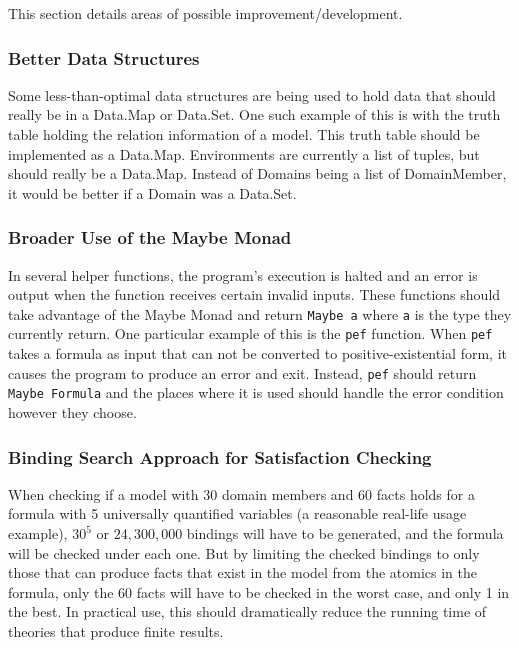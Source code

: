 		This section details areas of possible improvement/development.

		\subsubsection{Better Data Structures}

			Some less-than-optimal data structures are being used to hold data
			that should really be in a Data.Map or Data.Set. One such example
			of this is with the truth table holding the relation information of
			a model. This truth table should be implemented as a Data.Map.
			Environments are currently a list of tuples, but should really be a
			Data.Map. Instead of Domains being a list of DomainMember, it
			would be better if a Domain was a Data.Set.

		\subsubsection{Broader Use of the Maybe Monad}

			In several helper functions, the program's execution is halted and
			an error is output when the function receives certain invalid
			inputs. These functions should take advantage of the Maybe Monad
			and return {\tt Maybe a} where {\tt a} is the type they currently
			return. One particular example of this is the {\tt pef} function.
			When {\tt pef} takes a formula as input that can not be converted
			to positive-existential form, it causes the program to produce an
			error and exit. Instead, {\tt pef} should return {\tt Maybe
			Formula} and the places where it is used should handle the error
			condition however they choose.

		\subsubsection{Binding Search Approach for Satisfaction Checking}

			When checking if a model with 30 domain members and 60 facts holds
			for a formula with 5 universally quantified variables (a reasonable
			real-life usage example), $30^5$ or $24,300,000$ bindings will have
			to be generated, and the formula will be checked under each one.
			But by limiting the checked bindings to only those that can produce
			facts that exist in the model from the atomics in the formula, only
			the 60 facts will have to be checked in the worst case, and only 1
			in the best. In practical use, this should dramatically reduce the
			running time of theories that produce finite results.

